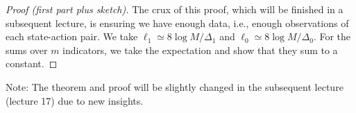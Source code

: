 \documentclass[11pt]{article}
\begin{document}
\begin{proof}[Proof (first part plus sketch)]
	The crux of this proof, which will be finished in a subsequent lecture, is ensuring we have enough data, i.e., enough observations of each state-action pair. We take $\ell_{1}\simeq 8\log M / \Delta_{1}$ and $\ell_{0} \simeq 8\log M / \Delta_{0}$. For the sums over $m$ indicators, we take the expectation and show that they sum to a constant.
\end{proof}

Note: The theorem and proof will be slightly changed in the subsequent lecture (lecture 17) due to new insights.




\end{document}
